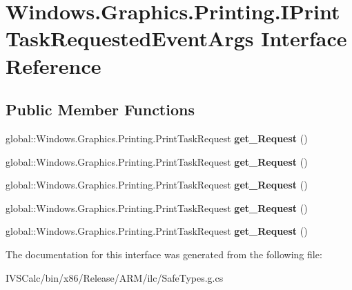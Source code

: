 \hypertarget{interface_windows_1_1_graphics_1_1_printing_1_1_i_print_task_requested_event_args}{}\section{Windows.\+Graphics.\+Printing.\+I\+Print\+Task\+Requested\+Event\+Args Interface Reference}
\label{interface_windows_1_1_graphics_1_1_printing_1_1_i_print_task_requested_event_args}
\subsection*{Public Member Functions}
\begin{DoxyCompactItemize}
\item 
\mbox{\label{interface_windows_1_1_graphics_1_1_printing_1_1_i_print_task_requested_event_args_aae67e95af6400752e80093e6b18d1143}} 
global\+::\+Windows.\+Graphics.\+Printing.\+Print\+Task\+Request {\bfseries get\+\_\+\+Request} ()
\item 
\mbox{\label{interface_windows_1_1_graphics_1_1_printing_1_1_i_print_task_requested_event_args_aae67e95af6400752e80093e6b18d1143}} 
global\+::\+Windows.\+Graphics.\+Printing.\+Print\+Task\+Request {\bfseries get\+\_\+\+Request} ()
\item 
\mbox{\label{interface_windows_1_1_graphics_1_1_printing_1_1_i_print_task_requested_event_args_aae67e95af6400752e80093e6b18d1143}} 
global\+::\+Windows.\+Graphics.\+Printing.\+Print\+Task\+Request {\bfseries get\+\_\+\+Request} ()
\item 
\mbox{\label{interface_windows_1_1_graphics_1_1_printing_1_1_i_print_task_requested_event_args_aae67e95af6400752e80093e6b18d1143}} 
global\+::\+Windows.\+Graphics.\+Printing.\+Print\+Task\+Request {\bfseries get\+\_\+\+Request} ()
\item 
\mbox{\label{interface_windows_1_1_graphics_1_1_printing_1_1_i_print_task_requested_event_args_aae67e95af6400752e80093e6b18d1143}} 
global\+::\+Windows.\+Graphics.\+Printing.\+Print\+Task\+Request {\bfseries get\+\_\+\+Request} ()
\end{DoxyCompactItemize}


The documentation for this interface was generated from the following file\+:\begin{DoxyCompactItemize}
\item 
I\+V\+S\+Calc/bin/x86/\+Release/\+A\+R\+M/ilc/Safe\+Types.\+g.\+cs\end{DoxyCompactItemize}
